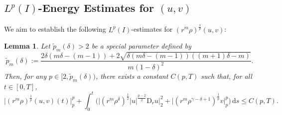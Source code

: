 \documentclass[11pt,reqno]{amsart}
\newtheorem{lem}{Lemma}[section]
\numberwithin{rk}{section}
\numberwithin{prop}{section}
\numberwithin{mydef}{section}
\numberwithin{lem}{section}
\numberwithin{equation}{section}
\numberwithin{thm}{section}
\begin{document}
 

\subsection{$L^p(I)$-Energy Estimates for $(u,v)$}

We aim to establish the following $L^{p}(I)$-estimates for $(r^m\rho)^{\frac{1}{p}}(u,v)$:
\begin{lem}\label{lemma-uv-lp}
Let $\tilde{p}_{m}(\delta)>2$ be a special parameter defined by
\begin{equation*}
\tilde{p}_m(\delta):=\frac{2\delta(m\delta-(m-1))+2\sqrt{\delta(m\delta-(m-1))((m+1)\delta-m)}}{m(1-\delta)^2}.
\end{equation*}
Then, for any $p\in [2,\tilde{p}_{m}(\delta))$, there exists a constant $C(p,T)$ such that, for all $t\in[0,T]$,
\begin{equation*}
\big|(r^m\rho)^\frac{1}{p}(u,v)(t)\big|_{p}^{p}+ \int_0^t\big(\big|(r^m\rho^\delta)^\frac{1}{2}|u|^\frac{p-2}{2}\mathrm{D}_r u\big|_{2}^{2}+\big|(r^m\rho^{\gamma-\delta+1})^\frac{1}{p} v\big|_{p}^{p}\big)\,\mathrm{d}s\leq C(p,T).
\end{equation*}
\end{lem}
\end{document}
